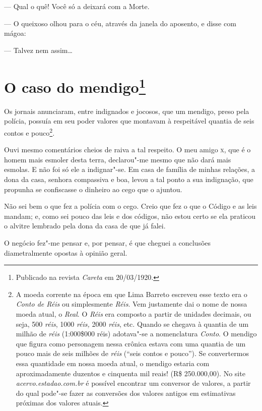 --- Qual o quê! Você só a deixará com a Morte.

--- O queixoso olhou para o céu, através da janela do aposento, e disse
com mágoa:

--- Talvez nem assim\ldots{}



\chapter[O caso do mendigo]{O caso do mendigo\footnote[*]{Publicado na revista \emph{Careta} em 20/03/1920.}}

Os jornais anunciaram, entre indignados e jocosos, que um mendigo, preso
pela polícia, possuía em seu poder valores que montavam à respeitável
quantia de seis contos e pouco\footnote{A moeda corrente na época em que
  Lima Barreto escreveu esse texto era o \emph{Conto de Réis} ou
  simplesmente \emph{Réis}. Vem justamente dai o nome de nossa moeda
  atual, o \emph{Real}. O \emph{Réis} era composto a partir de unidades
  decimais, ou seja, 500 \emph{réis}, 1000 \emph{réis,} 2000
  \emph{réis}, etc. Quando se chegava à quantia de um milhão de
  \emph{réis} (1:000\$000 réis) adotava"-se a nomenclatura
  \emph{Conto}. O mendigo que figura como personagem nessa crônica
  estava com uma quantia de um pouco mais de seis milhões de \emph{réis}
  (``seis contos e pouco''). Se convertermos essa quantidade em nossa
  moeda atual, o mendigo estaria com aproximadamente duzentos e
  cinquenta mil reais! (R\$ 250.000,00). No site
  \emph{acervo.estadao.com.br} é
  possível encontrar um conversor de valores, a partir do qual pode"-se
  fazer as conversões dos valores antigos em estimativas próximas dos
  valores atuais.}.

Ouvi mesmo comentários cheios de raiva a tal respeito. O meu amigo \textsc{x},
que é o homem mais esmoler desta terra, declarou"-me mesmo que não dará
mais esmolas. E não foi só ele a indignar"-se. Em casa de família de
minhas relações, a dona da casa, senhora compassiva e boa, levou a tal
ponto a sua indignação, que propunha se confiscasse o dinheiro ao cego
que o ajuntou.

Não sei bem o que fez a polícia com o cego. Creio que fez o que o Código
e as leis mandam; e, como sei pouco das leis e dos códigos, não estou
certo se ela praticou o alvitre lembrado pela dona da casa de que já
falei.

O negócio fez"-me pensar e, por pensar, é que cheguei a conclusões
diametralmente opostas à opinião geral.

